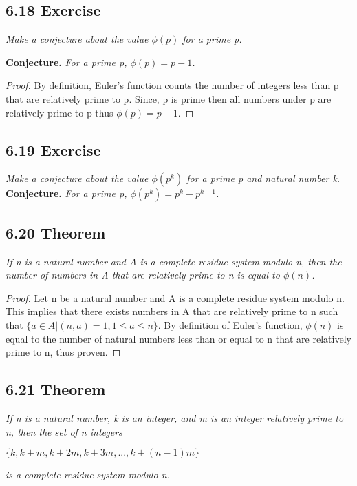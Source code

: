 \documentclass{article}
\begin{document}
\subsection*{6.18 Exercise} 
\quad \textit{Make a conjecture about the value $\phi(p)$ for a prime p.}

\textbf{Conjecture.} \textit{For a prime p, $\phi(p) = p - 1$.}
\begin{proof}
By definition, Euler's function counts the number of integers less than p that are relatively prime to p. Since, p is prime then all numbers under p are relatively prime to p thus $\phi(p) = p - 1$.
\end{proof}

\subsection*{6.19 Exercise} 
\quad \textit{Make a conjecture about the value $\phi(p^k)$ for a prime p and natural number k.}
\textbf{Conjecture.} \textit{For a prime p, $\phi(p^k) = p^k - p^{k-1}$.}

\subsection*{6.20 Theorem} 
\quad \textit{If n is a natural number and A is a complete residue system modulo n, then the number of numbers in A that are relatively prime to n is equal to $\phi(n)$.}

\begin{proof}
Let n be a natural number and A is a complete residue system modulo n. This implies that there exists numbers in A that are relatively prime to n such that $\{a \in A | (n,a) = 1, 1 \leq a \leq n\}$. By definition of Euler's function, $\phi(n)$ is equal to the number of natural numbers less than or equal to n that are relatively prime to n, thus proven.
\end{proof}

\subsection*{6.21 Theorem} 
\quad \textit{If n is a natural number, k is an integer, and m is an integer relatively prime to n, then the set of n integers}
\begin{center}
    $\{k, k+m, k+2m, k+3m,...,k+(n-1)m\}$
\end{center}
\textit{is a complete residue system modulo n.}
\end{document}
